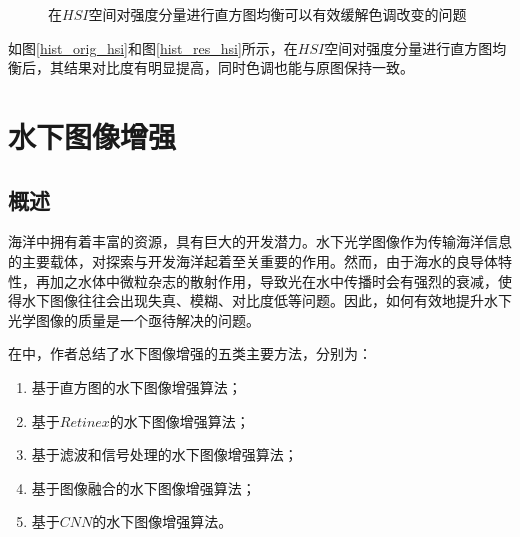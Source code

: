 \documentclass[UTF8]{ctexart}
\begin{document}
\begin{figure}[H]
{\begin{minipage}{0.45\linewidth}
                                               \label{hist_res_hsi}
                                           \end{minipage}
                                       }
                                       
                                       \caption{在$HSI$空间对强度分量进行直方图均衡可以有效缓解色调改变的问题}
                                       \label{butterworth}
                                   \end{figure}
                                   
                \indent 如图\ref{hist_orig_hsi}和图\ref{hist_res_hsi}所示，在$HSI$空间对强度分量进行直方图均衡后，其结果对比度有明显提高，同时色调也能与原图保持一致。                       
                                       
    \section{水下图像增强}
    
        \subsection{概述}
            \indent 海洋中拥有着丰富的资源，具有巨大的开发潜力。水下光学图像作为传输海洋信息的主要载体，对探索与开发海洋起着至关重要的作用\cite{lin2020基于优势特征图像融合的水下光学图像增强}。然而，由于海水的良导体特性，再加之水体中微粒杂志的散射作用，导致光在水中传播时会有强烈的衰减，使得水下图像往往会出现失真、模糊、对比度低等问题\cite{zou2020非均匀光照}。因此，如何有效地提升水下光学图像的质量是一个亟待解决的问题。
            
            \indent 在\cite{lin2020水下图像处理技术}中，作者总结了水下图像增强的五类主要方法，分别为：

                \begin{enumerate}[leftmargin=50pt]
                    \item 基于直方图的水下图像增强算法；
                    \item 基于$Retinex$的水下图像增强算法；
                    \item 基于滤波和信号处理的水下图像增强算法；
                    \item 基于图像融合的水下图像增强算法；
                    \item 基于$CNN$的水下图像增强算法。
    			\end{enumerate}                 
            
\end{document}
